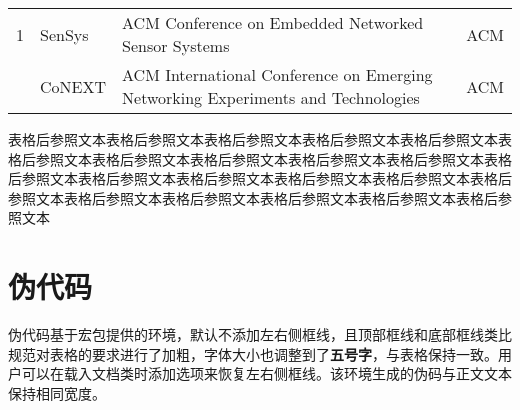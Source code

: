 \documentclass[print, doctor, vlined]{DissertUESTC}
\begin{document}
\begin{longtable}{m{2em}<{\centering} p{4.5em} p{15em} p{6em}}
		1 & SenSys & ACM Conference on Embedded Networked Sensor Systems & ACM \\
		\pagebreak  %
		2 & CoNEXT & ACM International Conference on Emerging Networking Experiments and Technologies & ACM \\
		
		
		
	\end{longtable}

	表格后参照文本表格后参照文本表格后参照文本表格后参照文本表格后参照文本表格后参照文本表格后参照文本表格后参照文本表格后参照文本表格后参照文本表格后参照文本表格后参照文本表格后参照文本表格后参照文本表格后参照文本表格后参照文本表格后参照文本表格后参照文本表格后参照文本表格后参照文本表格后参照文本
	
	\clearpage
	\section{伪代码}
	
	伪代码基于\href{https://mirrors.sustech.edu.cn/CTAN/macros/latex/contrib/algorithm2e/doc/algorithm2e.pdf}{}宏包提供的环境，默认不添加左右侧框线，且顶部框线和底部框线类比规范对表格的要求进行了加粗，字体大小也调整到了\textbf{五号字}，与表格保持一致。用户可以在载入文档类时添加选项来恢复左右侧框线。该环境生成的伪码与正文文本保持相同宽度。
	
\end{document}
